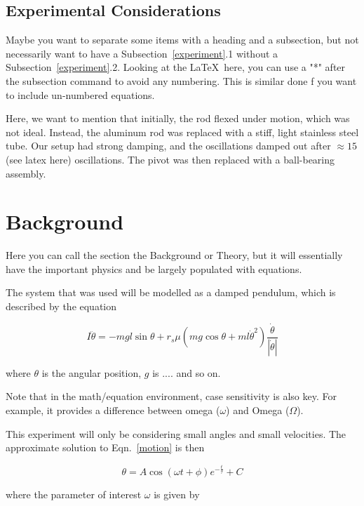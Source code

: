 \documentclass[prb,preprint,groupaddress,showpacs,superbib,floats]{revtex4-1}
\begin{document}
\subsection*{Experimental Considerations}

Maybe you want to separate some items with a heading and a subsection, but not necessarily want to have a Subsection~\ref{experiment}.1 without a Subsection~\ref{experiment}.2.  Looking at the \LaTeX \ here, you can use a "*" after the subsection command to avoid any numbering.  This is similar done f you want to include un-numbered equations.

Here, we want to mention that initially, the rod flexed under motion, which was not ideal.  Instead, the aluminum rod was replaced with a stiff, light stainless steel tube.  Our setup had strong damping, and the oscillations damped out after $\approx 15$ (see latex here) oscillations.  The pivot was then replaced with a ball-bearing assembly.  

\section{Background}

Here you can call the section the Background or Theory, but it will essentially have the important physics and be largely populated with equations.

The system that was used will be modelled as a damped pendulum, which is described by the equation

\begin{equation}\label{motion}
I \ddot{\theta} = - mgl \sin \theta + r_s \mu ( m g \cos \theta + m l \dot{\theta}^2 )\frac{\dot{\theta}}{|\dot{\theta}|}
\end{equation}

\noindent where $\theta$ is the angular position, $g$ is .... and so on.

Note that in the math/equation environment, case sensitivity is also key.  For example, it provides a difference between omega ($\omega$) and Omega ($\Omega$).

This experiment will only be considering small angles and small velocities.  The approximate solution to Eqn.~\ref{motion} is then

\begin{equation}\label{fitfunc}
\theta = A \cos (\omega t + \phi) e^{-\frac{t}{\tau}} + C
\end{equation}

\noindent where the parameter of interest $\omega$ is given by 
\end{document}
